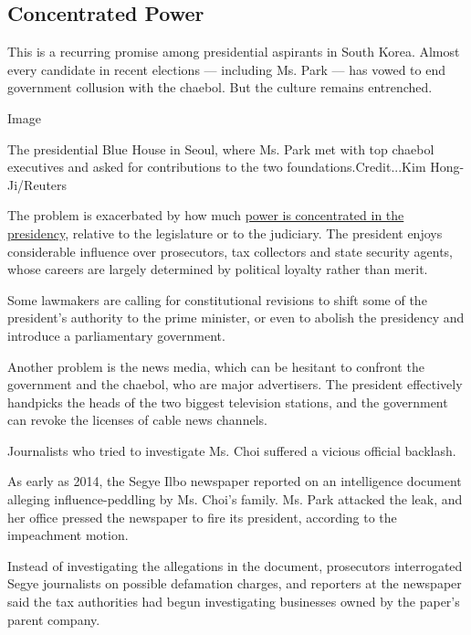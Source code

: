 \hypertarget{concentrated-power}{%
\subsection{Concentrated Power}\label{concentrated-power}}

This is a recurring promise among presidential aspirants in South Korea.
Almost every candidate in recent elections --- including Ms. Park ---
has vowed to end government collusion with the chaebol. But the culture
remains entrenched.

Image

The presidential Blue House in Seoul, where Ms. Park met with top
chaebol executives and asked for contributions to the two
foundations.Credit...Kim Hong-Ji/Reuters

The problem is exacerbated by how much
\href{https://www.nytimes.com/2016/11/12/world/asia/south-korea-park-geun-hye.html?rref=collection\%2Ftimestopic\%2FPark\%20Geun-hye\&action=click\&contentCollection=timestopics\&region=stream\&module=stream_unit\&version=latest\&contentPlacement=54\&pgtype=collection}{power
is concentrated in the presidency}, relative to the legislature or to
the judiciary. The president enjoys considerable influence over
prosecutors, tax collectors and state security agents, whose careers are
largely determined by political loyalty rather than merit.

Some lawmakers are calling for constitutional revisions to shift some of
the president's authority to the prime minister, or even to abolish the
presidency and introduce a parliamentary government.

Another problem is the news media, which can be hesitant to confront the
government and the chaebol, who are major advertisers. The president
effectively handpicks the heads of the two biggest television stations,
and the government can revoke the licenses of cable news channels.

Journalists who tried to investigate Ms. Choi suffered a vicious
official backlash.

As early as 2014, the Segye Ilbo newspaper reported on an intelligence
document alleging influence-peddling by Ms. Choi's family. Ms. Park
attacked the leak, and her office pressed the newspaper to fire its
president, according to the impeachment motion.

Instead of investigating the allegations in the document, prosecutors
interrogated Segye journalists on possible defamation charges, and
reporters at the newspaper said the tax authorities had begun
investigating businesses owned by the paper's parent company.

